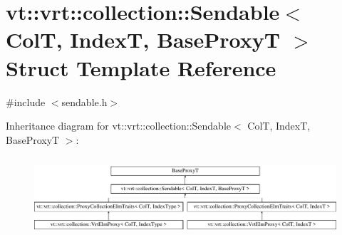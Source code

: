 \hypertarget{structvt_1_1vrt_1_1collection_1_1_sendable}{}\section{vt\+:\+:vrt\+:\+:collection\+:\+:Sendable$<$ ColT, IndexT, Base\+ProxyT $>$ Struct Template Reference}
\label{structvt_1_1vrt_1_1collection_1_1_sendable}


{\ttfamily \#include $<$sendable.\+h$>$}

Inheritance diagram for vt\+:\+:vrt\+:\+:collection\+:\+:Sendable$<$ ColT, IndexT, Base\+ProxyT $>$\+:\begin{figure}[H]
\begin{center}
\leavevmode
\includegraphics[height=2.994652cm]{structvt_1_1vrt_1_1collection_1_1_sendable}
\end{center}
\end{figure}
